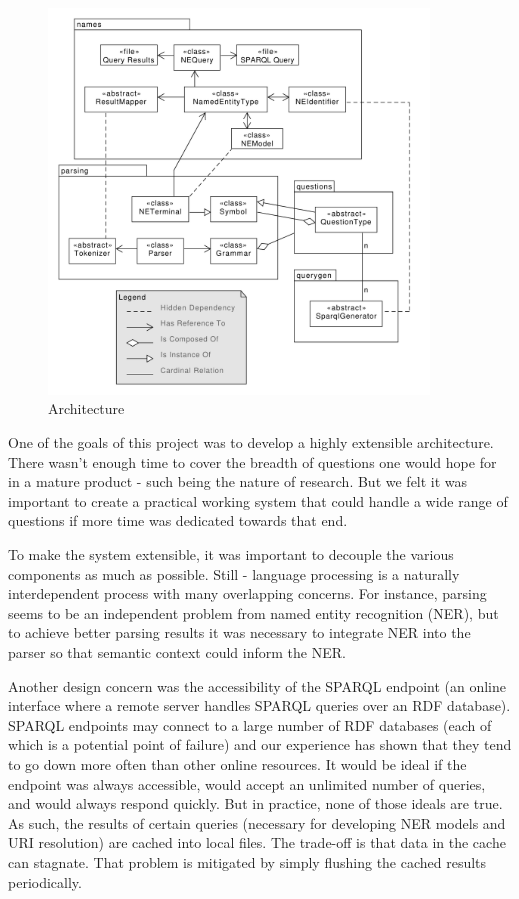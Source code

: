 \documentclass[11pt]{article}
\begin{document}
{\begin{figure}[h!]
    \centering
    \includegraphics[width=0.9\textwidth,natwidth=1,natheight=1]{umlet/architecture.pdf}
    \caption{Architecture}
    \label{fig:arch}
\end{figure}


One of the goals of this project was to develop a
highly extensible architecture. There wasn't enough time to cover the
breadth of questions one would hope for in a mature product - such being
the nature of research. But we felt it was important to create a practical
working system that could handle a wide range of questions if more
time was dedicated towards that end.

To make the system extensible, it was important to decouple the various
components as much as possible. Still - language processing is a naturally
interdependent process with many overlapping concerns. For instance,
parsing seems to be an independent problem from named entity recognition (NER),
but to achieve better parsing results it was necessary to integrate NER into the
parser so that semantic context could inform the NER. 

Another design concern was the accessibility of the SPARQL endpoint (an online
interface where a remote server handles SPARQL queries over an RDF database).
SPARQL endpoints may connect to a large number of RDF databases (each of which is
a potential point of failure) and our experience has shown that they tend
to go down more often than other online resources. It would be ideal if the 
endpoint was always accessible, would accept an unlimited
number of queries, and would always respond quickly. But in practice, none of
those ideals are true. As such, the results of certain queries
(necessary for developing NER models and URI resolution) are cached into local files.
The trade-off is that data in the cache can stagnate. That problem is mitigated by 
simply flushing the cached results periodically.

}
\end{document}
